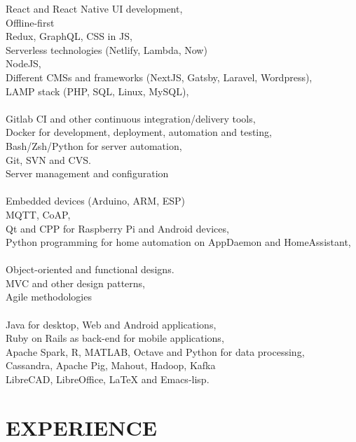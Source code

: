 \documentclass[margin, 10pt]{res} %
\begin{document}
\begin{resume}
React and React Native UI development,  \\
Offline-first \\
Redux, GraphQL, CSS in JS, \\
Serverless technologies (Netlify, Lambda, Now) \\
NodeJS, \\
Different CMSs and frameworks (NextJS, Gatsby, Laravel, Wordpress), \\
LAMP stack (PHP, SQL, Linux, MySQL), \\
\\
Gitlab CI and other continuous integration/delivery tools, \\
Docker for development, deployment, automation and testing, \\
Bash/Zsh/Python for server automation, \\
Git, SVN and CVS. \\
Server management and configuration \\
\\
Embedded devices (Arduino, ARM, ESP) \\
MQTT, CoAP, \\
Qt and CPP for Raspberry Pi and Android devices, \\
Python programming for home automation on AppDaemon and HomeAssistant, \\
\\
Object-oriented and functional designs. \\
MVC and other design patterns, \\
Agile methodologies \\
\\
Java for desktop, Web and Android applications, \\
Ruby on Rails as back-end for mobile applications, \\
Apache Spark, R, MATLAB, Octave and Python for data processing, \\
Cassandra, Apache Pig, Mahout, Hadoop, Kafka \\
LibreCAD, LibreOffice, LaTeX and Emacs-lisp. \\
 
 
\section{EXPERIENCE}


\end{resume}
\end{document}
